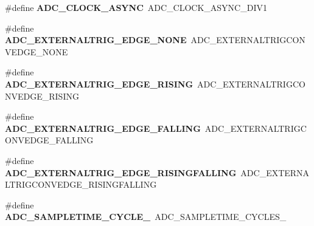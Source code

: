 \begin{DoxyCompactItemize}
\item 
\mbox{\label{group___h_a_l___a_d_c___aliased___defines_gae507056750621dbc26572874e89ef791}} 
\#define {\bfseries A\+D\+C\+\_\+\+C\+L\+O\+C\+K\+\_\+\+A\+S\+Y\+NC}~A\+D\+C\+\_\+\+C\+L\+O\+C\+K\+\_\+\+A\+S\+Y\+N\+C\+\_\+\+D\+I\+V1
\item 
\mbox{\label{group___h_a_l___a_d_c___aliased___defines_ga324129b8c65e1f89b0002c31297935eb}} 
\#define {\bfseries A\+D\+C\+\_\+\+E\+X\+T\+E\+R\+N\+A\+L\+T\+R\+I\+G\+\_\+\+E\+D\+G\+E\+\_\+\+N\+O\+NE}~A\+D\+C\+\_\+\+E\+X\+T\+E\+R\+N\+A\+L\+T\+R\+I\+G\+C\+O\+N\+V\+E\+D\+G\+E\+\_\+\+N\+O\+NE
\item 
\mbox{\label{group___h_a_l___a_d_c___aliased___defines_ga7955225cafbadae21be3c9eaaab4bd58}} 
\#define {\bfseries A\+D\+C\+\_\+\+E\+X\+T\+E\+R\+N\+A\+L\+T\+R\+I\+G\+\_\+\+E\+D\+G\+E\+\_\+\+R\+I\+S\+I\+NG}~A\+D\+C\+\_\+\+E\+X\+T\+E\+R\+N\+A\+L\+T\+R\+I\+G\+C\+O\+N\+V\+E\+D\+G\+E\+\_\+\+R\+I\+S\+I\+NG
\item 
\mbox{\label{group___h_a_l___a_d_c___aliased___defines_ga0b539c9290d819da8932016f4a4ca2a1}} 
\#define {\bfseries A\+D\+C\+\_\+\+E\+X\+T\+E\+R\+N\+A\+L\+T\+R\+I\+G\+\_\+\+E\+D\+G\+E\+\_\+\+F\+A\+L\+L\+I\+NG}~A\+D\+C\+\_\+\+E\+X\+T\+E\+R\+N\+A\+L\+T\+R\+I\+G\+C\+O\+N\+V\+E\+D\+G\+E\+\_\+\+F\+A\+L\+L\+I\+NG
\item 
\mbox{\label{group___h_a_l___a_d_c___aliased___defines_gaa0c1b4c780d8091fd60f2624ceb2f3a4}} 
\#define {\bfseries A\+D\+C\+\_\+\+E\+X\+T\+E\+R\+N\+A\+L\+T\+R\+I\+G\+\_\+\+E\+D\+G\+E\+\_\+\+R\+I\+S\+I\+N\+G\+F\+A\+L\+L\+I\+NG}~A\+D\+C\+\_\+\+E\+X\+T\+E\+R\+N\+A\+L\+T\+R\+I\+G\+C\+O\+N\+V\+E\+D\+G\+E\+\_\+\+R\+I\+S\+I\+N\+G\+F\+A\+L\+L\+I\+NG
\item 
\mbox{\label{group___h_a_l___a_d_c___aliased___defines_ga5a51fc2613e4af9bd780b00878393cc0}} 
\#define {\bfseries A\+D\+C\+\_\+\+S\+A\+M\+P\+L\+E\+T\+I\+M\+E\+\_\+C\+Y\+C\+L\+E\+\_}~A\+D\+C\+\_\+\+S\+A\+M\+P\+L\+E\+T\+I\+M\+E\+\_\+C\+Y\+C\+L\+E\+S\+\_
\item 
\mbox{\label{group___h_a_l___a_d_c___aliased___defines_ga3bfd5015d60e3116e55ff81e6627f041}} 

\end{DoxyCompactItemize}
